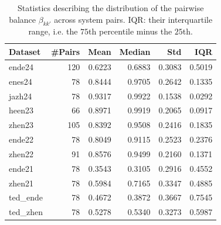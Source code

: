 \documentclass[11pt]{article}
\begin{document}
\begin{table}[t]
\centering
\begin{tabular}{lrrrrr}
\toprule
Dataset & \#Pairs & Mean & Median & Std & IQR \\
\midrule
ende24 & 120 & 0.6223 & 0.6883 & 0.3083 & 0.5019 \\
enes24 & 78 & 0.8444 & 0.9705 & 0.2642 & 0.1335 \\
jazh24 & 78 & 0.9317 & 0.9922 & 0.1538 & 0.0292 \\
heen23 & 66 & 0.8971 & 0.9919 & 0.2065 & 0.0917 \\
zhen23 & 105 & 0.8392 & 0.9508 & 0.2416 & 0.1835 \\
ende22 & 78 & 0.8049 & 0.9115 & 0.2523 & 0.2376 \\
zhen22 & 91 & 0.8576 & 0.9499 & 0.2160 & 0.1371 \\
ende21 & 78 & 0.3543 & 0.3105 & 0.2916 & 0.4552 \\
zhen21 & 78 & 0.5984 & 0.7165 & 0.3347 & 0.4885 \\
ted\_ende & 78 & 0.4672 & 0.3872 & 0.3667 & 0.7545 \\
ted\_zhen & 78 & 0.5278 & 0.5340 & 0.3273 & 0.5987 \\
\bottomrule
\end{tabular}%
\caption{Statistics describing the distribution of the pairwise balance $\beta_{kk'}$ across system pairs. IQR: their interquartile range, i.e. the $75$th percentile minus the $25$th.}
\label{tab:dataset-betaij}
\end{table}
\end{document}
